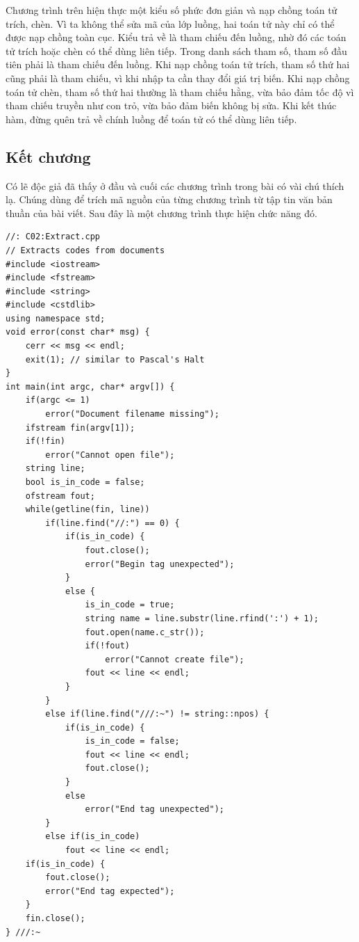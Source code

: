 \documentclass[11pt]{article}
\begin{document}
Chương trình trên hiện thực một kiểu số phức đơn giản và nạp chồng toán tử
trích, chèn. Vì ta không thể sửa mã của lớp luồng, hai toán tử này chỉ có thể
được nạp chồng toàn cục. Kiểu trả về là tham chiếu đến luồng, nhờ đó các toán
tử trích hoặc chèn có thể dùng liên tiếp. Trong danh sách tham số, tham số đầu
tiên phải là tham chiếu đến luồng. Khi nạp chồng toán tử trích, tham số thứ
hai cũng phải là tham chiếu, vì khi nhập ta cần thay đổi giá trị biến. Khi
nạp chồng toán tử chèn, tham số thứ hai thường là tham chiếu hằng, vừa bảo
đảm tốc độ vì tham chiếu truyền như con trỏ, vừa bảo đảm biến không bị sửa.
Khi kết thúc hàm, đừng quên trả về chính luồng để toán tử có thể dùng liên
tiếp.

\subsection{Kết chương}

Có lẽ độc giả đã thấy ở đầu và cuối các chương trình trong bài có vài chú
thích lạ. Chúng dùng để trích mã nguồn của từng chương trình từ tập tin văn
bản thuần của bài viết. Sau đây là một chương trình thực hiện chức năng đó.

\begin{verbatim}
//: C02:Extract.cpp
// Extracts codes from documents
#include <iostream>
#include <fstream>
#include <string>
#include <cstdlib>
using namespace std;
void error(const char* msg) {
    cerr << msg << endl;
    exit(1); // similar to Pascal's Halt
}
int main(int argc, char* argv[]) {
    if(argc <= 1)
        error("Document filename missing");
    ifstream fin(argv[1]);
    if(!fin)
        error("Cannot open file");
    string line;
    bool is_in_code = false;
    ofstream fout;
    while(getline(fin, line))
        if(line.find("//:") == 0) {
            if(is_in_code) {
                fout.close();
                error("Begin tag unexpected");
            }
            else {
                is_in_code = true;
                string name = line.substr(line.rfind(':') + 1);
                fout.open(name.c_str());
                if(!fout)
                    error("Cannot create file");
                fout << line << endl;
            }
        }
        else if(line.find("///:~") != string::npos) {
            if(is_in_code) {
                is_in_code = false;
                fout << line << endl;
                fout.close();
            }
            else
                error("End tag unexpected");
        }
        else if(is_in_code)
            fout << line << endl;
    if(is_in_code) {
        fout.close();
        error("End tag expected");
    }
    fin.close();
} ///:~
\end{verbatim}
\end{document}
